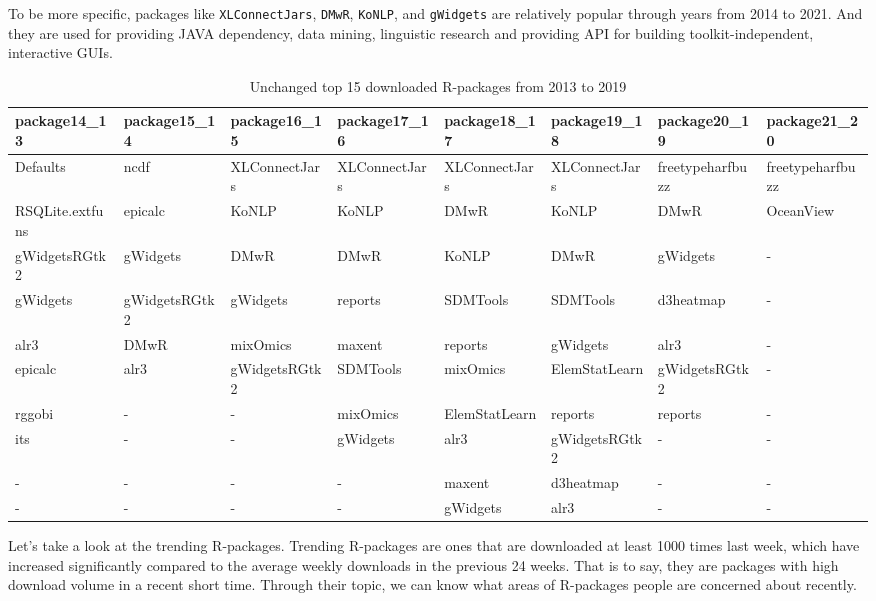 \documentclass[
]{book}
\begin{document}
To be more specific, packages like \texttt{XLConnectJars}, \texttt{DMwR}, \texttt{KoNLP}, and \texttt{gWidgets} are relatively popular through years from 2014 to 2021. And they are used for providing JAVA dependency, data mining, linguistic research and providing API for building toolkit-independent, interactive GUIs.

\begin{table}

\caption{\label{tab:unchanged-top15pkg}Unchanged top 15 downloaded R-packages from 2013 to 2019}
\centering
\begin{tabular}[t]{l|l|l|l|l|l|l|l}
\hline
package14\_13 & package15\_14 & package16\_15 & package17\_16 & package18\_17 & package19\_18 & package20\_19 & package21\_20\\
\hline
Defaults & ncdf & XLConnectJars & XLConnectJars & XLConnectJars & XLConnectJars & freetypeharfbuzz & freetypeharfbuzz\\
\hline
RSQLite.extfuns & epicalc & KoNLP & KoNLP & DMwR & KoNLP & DMwR & OceanView\\
\hline
gWidgetsRGtk2 & gWidgets & DMwR & DMwR & KoNLP & DMwR & gWidgets & -\\
\hline
gWidgets & gWidgetsRGtk2 & gWidgets & reports & SDMTools & SDMTools & d3heatmap & -\\
\hline
alr3 & DMwR & mixOmics & maxent & reports & gWidgets & alr3 & -\\
\hline
epicalc & alr3 & gWidgetsRGtk2 & SDMTools & mixOmics & ElemStatLearn & gWidgetsRGtk2 & -\\
\hline
rggobi & - & - & mixOmics & ElemStatLearn & reports & reports & -\\
\hline
its & - & - & gWidgets & alr3 & gWidgetsRGtk2 & - & -\\
\hline
- & - & - & - & maxent & d3heatmap & - & -\\
\hline
- & - & - & - & gWidgets & alr3 & - & -\\
\hline
\end{tabular}
\end{table}

Let's take a look at the trending R-packages. Trending R-packages are ones that are downloaded at least 1000 times last week, which have increased significantly compared to the average weekly downloads in the previous 24 weeks\autocite{r-hub}. That is to say, they are packages with high download volume in a recent short time. Through their topic, we can know what areas of R-packages people are concerned about recently.
\end{document}
